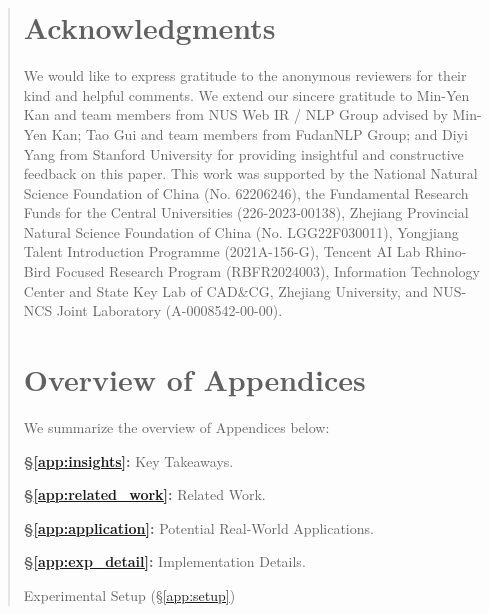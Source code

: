 \documentclass[11pt]{article}
\begin{document}
\begin{abstract}
\section*{Acknowledgments}
We would like to express gratitude to the anonymous reviewers for their kind and helpful comments. 
We extend our sincere gratitude to Min-Yen Kan and team members from NUS Web IR / NLP Group advised by Min-Yen Kan; Tao Gui and team members from FudanNLP Group; and Diyi Yang from Stanford University for providing insightful and constructive feedback on this paper. 
This work was supported by the National Natural Science Foundation of China (No. 62206246), the Fundamental Research Funds for the Central Universities (226-2023-00138), Zhejiang Provincial Natural Science Foundation of China (No. LGG22F030011), Yongjiang Talent Introduction Programme (2021A-156-G), Tencent AI Lab Rhino-Bird Focused Research Program (RBFR2024003), Information Technology Center and State Key Lab of CAD\&CG, Zhejiang University, and NUS-NCS Joint Laboratory (A-0008542-00-00). 



% 

\clearpage
\appendix


\section*{Overview of Appendices}
\label{app:overview}

We summarize the overview of Appendices below: 

\noindent
\textbf{\S\ref{app:insights}:} Key Takeaways. 


\noindent
\textbf{\S\ref{app:related_work}:} Related Work. 


\noindent
\textbf{\S\ref{app:application}:} Potential Real-World Applications. 


\noindent
\textbf{\S\ref{app:exp_detail}:} Implementation Details. 

\quad\quad Experimental Setup (\S\ref{app:setup})


\end{abstract}
\end{document}
